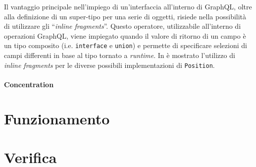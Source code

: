 
Il vantaggio principale nell'impiego di un'interfaccia all'interno di GraphQL, oltre alla definizione di un super-tipo per una serie di oggetti,
risiede nella possibilità di utilizzare gli ``\textit{inline fragments}''. Questo operatore, utilizzabile all'interno di operazioni GraphQL, viene impiegato
quando il valore di ritorno di un campo è un tipo composito (i.e. \texttt{interface} e \texttt{union}) e permette di specificare selezioni di campi differenti
in base al tipo tornato a \textit{runtime}. In  è mostrato l'utilizzo di \textit{inline fragments} per le diverse possibili implementazioni
di \texttt{Position}.



\paragraph{Concentration}

\section{Funzionamento}\label{sec:functioning}

\section{Verifica}\label{sec:testing}


